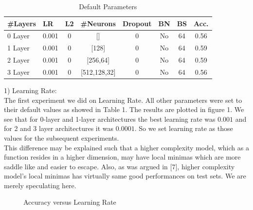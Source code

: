 \documentclass[conference,compsoc]{IEEEtran}
\begin{document}
\begin{table}[]
\centering
\caption{Default Parameters}
\label{my-label}
\begin{tabular}{l|ccccccc}
\#Layers & \multicolumn{1}{l}{LR} & \multicolumn{1}{l}{L2} & \multicolumn{1}{l}{\#Neurons} & \multicolumn{1}{l}{Dropout} & \multicolumn{1}{l}{BN} & \multicolumn{1}{l}{BS} & \multicolumn{1}{l}{Acc.} \\ \hline
0 Layer & 0.001 & 0 & {[}{]} & 0 & No & 64 & 0.56 \\ \cline{2-8} 
1 Layer & 0.001 & 0 & {[}128{]} & 0 & No & 64 & 0.59 \\ \cline{2-8} 
2 Layer & 0.001 & 0 & {[}256,64{]} & 0 & No & 64 & 0.59 \\ \cline{2-8} 
3 Layer & 0.001 & 0 & {[}512,128,32{]} & 0 & No & 64 & 0.56
\end{tabular}
\end{table}
1) Learning Rate: \\

The first experiment we did on Learning Rate. All other parameters were set to their default values as showed in Table 1. The results are plotted in figure 1.  We see that for 0-layer and 1-layer architectures the best learning rate was $0.001$ and for 2 and 3 layer architectures it was $0.0001$. So we set learning rate as those values for the subsequent experiments. \\

This difference may be explained such that a higher complexity model, which as a function resides in a higher dimension, may have local minimas which are more saddle like and easier to escape. Also, as was argued in [7], higher complexity model's local minimas has virtually same good performances on test sets. We are merely speculating here.

\begin{figure}
\caption{Accuracy versus Learning Rate}
\end{figure}
\end{document}
